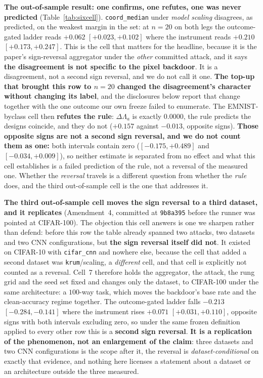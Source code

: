 \documentclass{article}
\begin{document}
\textbf{The out-of-sample result: one confirms, one refutes, one was never predicted} (Table~\ref{tab:sixcell}). \texttt{coord\_median} under \emph{model scaling} disagrees, as predicted, on the weakest margin in the set: at $n{=}20$ on both legs the outcome-gated ladder reads $+0.062$ $[+0.023,+0.102]$ where the instrument reads $+0.210$ $[+0.173,+0.247]$. This is the cell that matters for the headline, because it is the paper's sign-reversal aggregator under the \emph{other} committed attack, and it says \textbf{the disagreement is not specific to the pixel backdoor}. It is a disagreement, not a second sign reversal, and we do not call it one. \textbf{The top-up that brought this row to $n{=}20$ changed the disagreement's character without changing its label}, and the disclosures below report that change together with the one outcome our own freeze failed to enumerate. The EMNIST-byclass cell then \textbf{refutes the rule}: $\Delta\Lambda_a$ is exactly $0.0000$, the rule predicts the designs coincide, and they do not ($+0.157$ against $-0.013$, opposite signs). \textbf{Those opposite signs are not a second sign reversal, and we do not count them as one:} both intervals contain zero ($[-0.175,+0.489]$ and $[-0.034,+0.009]$), so neither estimate is separated from no effect and what this cell establishes is a failed prediction of the rule, not a reversal of the measured one. Whether the \emph{reversal} travels is a different question from whether the \emph{rule} does, and the third out-of-sample cell is the one that addresses it.

\textbf{The third out-of-sample cell moves the sign reversal to a third dataset, and it replicates} (Amendment~4, committed at \texttt{9b8a395} before the runner was pointed at CIFAR-100). The objection this cell answers is one we sharpen rather than defend: before this row the table already spanned two attacks, two datasets and two CNN configurations, but \textbf{the sign reversal itself did not}. It existed on CIFAR-10 with \texttt{cifar\_cnn} and nowhere else, because the cell that added a second dataset was \texttt{krum}/scaling, a \emph{different} cell, and that cell is explicitly not counted as a reversal. Cell~7 therefore holds the aggregator, the attack, the rung grid and the seed set fixed and changes only the dataset, to CIFAR-100 under the same architecture: a $100$-way task, which moves the backdoor's base rate and the clean-accuracy regime together. The outcome-gated ladder falls $-0.213$ $[-0.284,-0.141]$ where the instrument rises $+0.071$ $[+0.031,+0.110]$, opposite signs with both intervals excluding zero, so under the same frozen definition applied to every other row this is a \textbf{second sign reversal}. \textbf{It is a replication of the phenomenon, not an enlargement of the claim}: three datasets and two CNN configurations is the scope after it, the reversal is \emph{dataset-conditional} on exactly that evidence, and nothing here licenses a statement about a dataset or an architecture outside the three measured.
\end{document}
